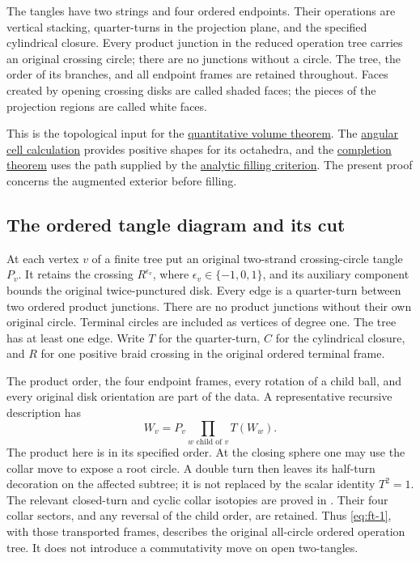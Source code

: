 The tangles have two strings and four ordered endpoints. Their operations are vertical stacking, quarter-turns in the projection plane, and the specified cylindrical closure. Every product junction in the reduced operation tree carries an original crossing circle; there are no junctions without a circle. The tree, the order of its branches, and all endpoint frames are retained throughout. Faces created by opening crossing disks are called shaded faces; the pieces of the projection regions are called white faces.

This is the topological input for the \hyperref[ch:quantitative-circle-trees]{quantitative volume theorem}. The \hyperref[sec:fa]{angular cell calculation} provides positive shapes for its octahedra, and the \hyperref[sec:fg]{completion theorem} uses the path supplied by the \hyperref[sec:qe]{analytic filling criterion}. The present proof concerns the augmented exterior before filling.

\subsection{The ordered tangle diagram and its cut}\label{sec:ft-1}

At each vertex \(v\) of a finite tree put an original two-strand crossing-circle tangle \(P_v\). It retains the crossing \(R^{\epsilon_v}\), where \(\epsilon_v\in\{-1,0,1\}\), and its auxiliary component bounds the original twice-punctured disk. Every edge is a quarter-turn between two ordered product junctions. There are no product junctions without their own original circle. Terminal circles are included as vertices of degree one. The tree has at least one edge. Write \(T\) for the quarter-turn, \(C\) for the cylindrical closure, and \(R\) for one positive braid crossing in the original ordered terminal frame.

The product order, the four endpoint frames, every rotation of a child ball, and every original disk orientation are part of the data. A representative recursive description has
\begin{equation}
W_v=P_v\prod_{w\text{ child of }v}T(W_w).
\label{eq:ft-1}
\end{equation}
The product here is in its specified order. At the closing sphere one may use the collar move to expose a root circle. A double turn then leaves its half-turn decoration on the affected subtree; it is not replaced by the scalar identity \(T^2=1\). The relevant closed-turn and cyclic collar isotopies are proved in
\cite[Lemmas~3.1--3.2]{ConwayReductions}. Their four collar sectors, and any reversal of the child order, are retained. Thus \eqref{eq:ft-1}, with those transported frames, describes the original all-circle ordered operation tree. It does not introduce a commutativity move on open two-tangles.

